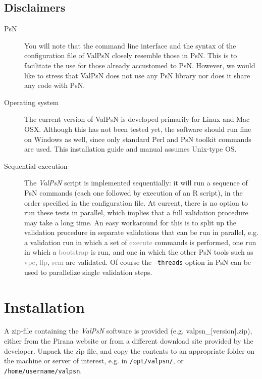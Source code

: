 \documentclass[a4,11pt]{report} \usepackage[pdftex]{graphicx}
\newcommand{\ValPsN}{\textcolor{PiranaOrange}{\textit{ValPsN}}\xspace}
\newcommand{\psn}[1]{\textcolor{Grey}{#1}}
\begin{document}
\section{Disclaimers}
\begin{description}
\item[PsN] You will note that the command line interface and the
  syntax of the configuration file of ValPsN closely resemble those in
  PsN. This is to facilitate the use for those already accustomed
  to PsN. However, we would like to stress that ValPsN does not use
  any PsN library nor does it share any code with PsN.

\item[Operating system] The current version of ValPsN is developed
  primarily for Linux and Mac OSX. Although this has not been tested
  yet, the software should run fine on Windows as well, since only
  standard Perl and PsN toolkit commands are used. This installation
  guide and manual assumes Unix-type OS.

\item[Sequential execution] The \ValPsN script is implemented
  sequentially: it will run a sequence of PsN commands (each one
  followed by execution of an R script), in the order specified in the
  configuration file. At current, there is no option to run these
  tests in parallel, which implies that a full validation procedure
  may take a long time. An easy workaround for this is to split up the
  validation procedure in separate validations that can be run in
  parallel, e.g. a validation run in which a set of \psn{execute}
  commands is performed, one run in which a \psn{bootstrap} is run,
  and one in which the other PsN tools such as \psn{vpc}, \psn{llp},
  \psn{scm} are validated. Of course the {\tt -threads} option in PsN
  can be used to parallelize single validation steps.

\end{description}

\chapter{Installation}

A zip-file containing the \ValPsN software is provided
(e.g. valpsn\_[version].zip), either from the Pirana website or from a
different download site provided by the developer. Unpack the zip
file, and copy the contents to an appropriate folder on the machine or
server of interest, e.g. in {\tt /opt/valpsn/}, or {\tt
  /home/username/valpsn}.
\end{document}

